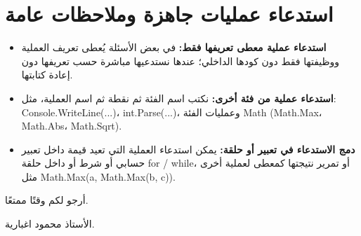 \documentclass[14pt]{extarticle}
\begin{document}
\section{استدعاء عمليات جاهزة وملاحظات عامة}
\begin{itemize}[nosep]
    \item \textbf{استدعاء عملية معطى تعريفها فقط:} في بعض الأسئلة يُعطى تعريف العملية ووظيفتها فقط دون كودها الداخلي؛ عندها نستدعيها مباشرة حسب تعريفها دون إعادة كتابتها.
    \item \textbf{استدعاء عملية من فئة أخرى:} نكتب اسم الفئة ثم نقطة ثم اسم العملية، مثل: \\
    \textenglish{Console.WriteLine(...)}، \textenglish{int.Parse(...)}، وعمليات الفئة \textenglish{Math} (\textenglish{Math.Max}، \textenglish{Math.Abs}، \textenglish{Math.Sqrt}).
    \item \textbf{دمج الاستدعاء في تعبير أو حلقة:} يمكن استدعاء العملية التي تعيد قيمة داخل تعبير حسابي أو شرط أو داخل حلقة \textenglish{for} / \textenglish{while}، أو تمرير نتيجتها كمعطى لعملية أخرى مثل \textenglish{Math.Max(a, Math.Max(b, c))}.
\end{itemize}

\vspace{1cm}
\begin{flushleft}
أرجو لكم وقتًا ممتعًا.

الأستاذ محمود اغبارية.
\end{flushleft}
\end{document}
